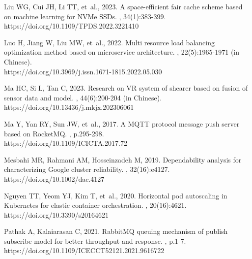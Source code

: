 \begin{thebibliography}{}
Liu WG, Cui JH, Li TT, {et~al.}, 2023.
\newblock A space-efficient fair cache scheme based on machine learning for NVMe SSDs.
, 34(1):383-399. \\
https://doi.org/10.1109/TPDS.2022.3221410

Luo H, Jiang W, Liu MW, {et~al.}, 2022.
\newblock Multi resource load balancing optimization method based on microservice architecture.
, 22(5):1965-1971 (in Chinese). \\
https://doi.org/10.3969/j.issn.1671-1815.2022.05.030

Ma HC, Si L, Tan C, 2023.
\newblock Research on VR system of shearer based on fusion of sensor data and model.
, 44(6):200-204 (in Chinese). \\
https://doi.org/10.13436/j.mkjx.202306061

Ma Y, Yan RY, Sun JW, {et~al.}, 2017.
\newblock A MQTT protocol message push server based on RocketMQ.
, p.295-298. \\
https://doi.org/10.1109/ICICTA.2017.72

Mesbahi MR, Rahmani AM, Hosseinzadeh M, 2019.
\newblock Dependability analysis for characterizing Google cluster reliability.
, 32(16):e4127. \\
https://doi.org/10.1002/dac.4127

Nguyen TT, Yeom YJ, Kim T, {et~al.}, 2020.
\newblock Horizontal pod autoscaling in Kubernetes for elastic container orchestration.
, 20(16):4621. \\
https://doi.org/10.3390/s20164621

Pathak A, Kalaiarasan C, 2021.
\newblock RabbitMQ queuing mechanism of publish subscribe model for better throughput and response.
, p.1-7. \\
https://doi.org/10.1109/ICECCT52121.2021.9616722


\end{thebibliography}
